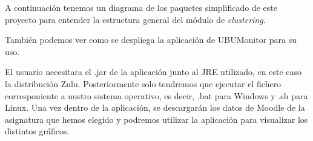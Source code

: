
A continuación tenemos un diagrama de los paquetes simplificado de este proyecto para entender la estructura general del módulo de \emph{clustering}.


También podemos ver como se despliega la aplicación de UBUMonitor para su uso. 


El usuario necesitara el .jar de la aplicación junto al JRE utilizado, en este caso la distribución Zulu. Posteriormente solo tendremos que ejecutar el fichero corresponiente a nustro sistema operativo, es decir, .bat para Windows y .sh para Linux. Una vez dentro de la aplicación, se descargarán los datos de Moodle de la asignatura que hemos elegido y podremos utilizar la aplicación para visualizar los distintos gráficos.